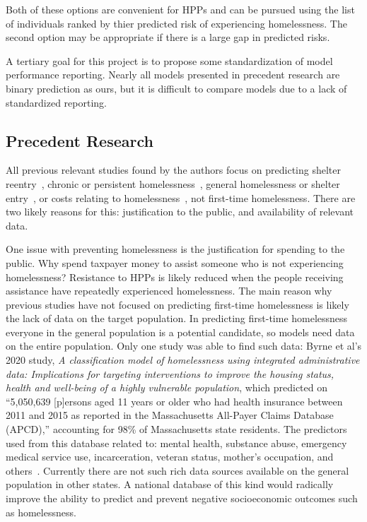 \documentclass[10pt,letterpaper]{article}
\begin{document}
Both of these options are convenient for HPPs and can be pursued using the list of individuals ranked by thier predicted risk of experiencing homelessness. The second option may be appropriate if there is a large gap in predicted risks.

A tertiary goal for this project is to propose some standardization of model performance reporting. Nearly all models presented in precedent research are binary prediction as ours, but it is difficult to compare models due to a lack of standardized reporting.

\subsection*{Precedent Research}
All previous relevant studies found by the authors focus on predicting shelter reentry~\cite{hong2018applications}, chronic or persistent homelessness~\cite{vanberlo2021interpretable, toros2019early}, general homelessness or shelter entry~\cite{byrne2020classification, shinn2013efficient}, or costs relating to homelessness~\cite{flaming2011crisis}, not first-time homelessness. There are two likely reasons for this: justification to the public, and availability of relevant data.

One issue with preventing homelessness is the justification for spending to the public. Why spend taxpayer money to assist someone who is not experiencing homelessness? Resistance to HPPs is likely reduced when the people receiving assistance have repeatedly experienced homelessness. The main reason why previous studies have not focused on predicting first-time homelessness is likely the lack of data on the target population. In predicting first-time homelessness everyone in the general population is a potential candidate, so models need data on the entire population. Only one study was able to find such data: Byrne et al's 2020 study, \textit{A classification model of homelessness using integrated administrative data: Implications for targeting interventions to improve the housing status, health and well-being of a highly vulnerable population}, which predicted on ``5,050,639 [p]ersons aged 11 years or older who had health insurance between 2011 and 2015 as reported in the Massachusetts All-Payer Claims Database (APCD),'' accounting for 98\% of Massachusetts state residents. The predictors used from this database related to: mental health, substance abuse, emergency medical service use, incarceration, veteran status, mother's occupation, and others~\cite{byrne2020classification}. Currently there are not such rich data sources available on the general population in other states. A national database of this kind would radically improve the ability to predict and prevent negative socioeconomic outcomes such as homelessness.
\end{document}
